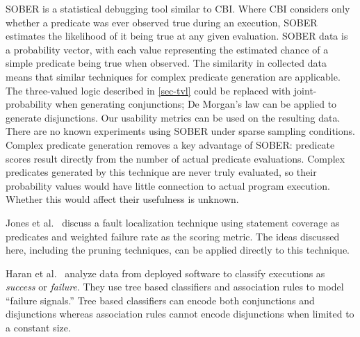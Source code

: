 SOBER \cite{1081753} is a statistical debugging tool similar to CBI\@.  Where CBI considers only whether a predicate was ever observed true during an execution, SOBER estimates the likelihood of it being true at any given evaluation.  SOBER data is a probability vector, with each value representing the estimated chance of a simple predicate being true when observed.  The similarity in collected data means that similar techniques for complex predicate generation are applicable.  The three-valued logic described in \autoref{sec-tvl} could be replaced with joint-probability when generating conjunctions; De Morgan's law can be applied to generate disjunctions.  Our usability metrics can be used on the resulting data.  There are no known experiments using SOBER under sparse sampling conditions.  Complex predicate generation removes a key advantage of SOBER: predicate scores result directly from the number of actual predicate evaluations.  Complex predicates generated by this technique are never truly evaluated, so their probability values would have little connection to actual program execution.  Whether this would affect their usefulness is unknown.

Jones et al.\ \cite{1101949} discuss a fault localization technique using statement coverage as predicates and weighted failure rate as the scoring metric.  The ideas discussed here, including the pruning techniques, can be applied directly to this technique.

Haran et al.\ \cite{haran05TCEDS} analyze data from deployed software to classify executions as \emph{success} or \emph{failure}.  They use tree based classifiers and association rules to model ``failure signals.''  Tree based classifiers can encode both conjunctions and disjunctions whereas association rules cannot encode disjunctions when limited to a constant size.



